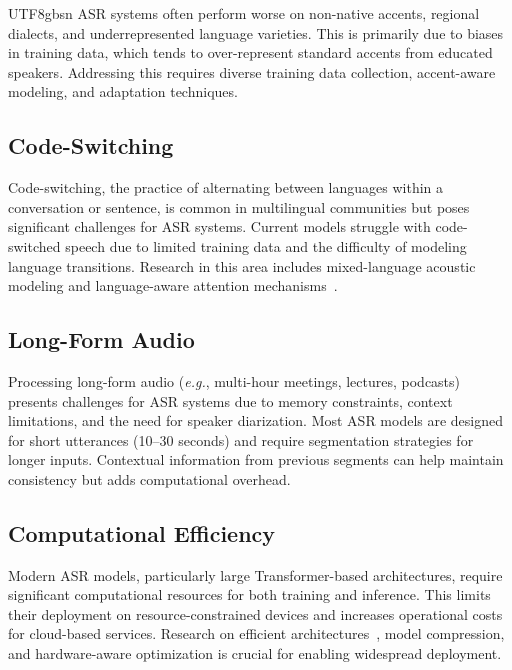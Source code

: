\documentclass[12pt,a4paper]{article}
\newcommand{\eg}{\textit{e.g.}}
\begin{document}
\begin{CJK}{UTF8}{gbsn}
ASR systems often perform worse on non-native accents, regional dialects, and underrepresented language varieties. This is primarily due to biases in training data, which tends to over-represent standard accents from educated speakers. Addressing this requires diverse training data collection, accent-aware modeling, and adaptation techniques.

\subsection{Code-Switching}
\label{subsec:codeswitch}

Code-switching, the practice of alternating between languages within a conversation or sentence, is common in multilingual communities but poses significant challenges for ASR systems. Current models struggle with code-switched speech due to limited training data and the difficulty of modeling language transitions. Research in this area includes mixed-language acoustic modeling and language-aware attention mechanisms~\cite{li2022code}.

\subsection{Long-Form Audio}
\label{subsec:longform}

Processing long-form audio (\eg, multi-hour meetings, lectures, podcasts) presents challenges for ASR systems due to memory constraints, context limitations, and the need for speaker diarization. Most ASR models are designed for short utterances (10--30 seconds) and require segmentation strategies for longer inputs. Contextual information from previous segments can help maintain consistency but adds computational overhead.

\subsection{Computational Efficiency}
\label{subsec:efficiency}

Modern ASR models, particularly large Transformer-based architectures, require significant computational resources for both training and inference. This limits their deployment on resource-constrained devices and increases operational costs for cloud-based services. Research on efficient architectures~\cite{kim2023squeezeformer}, model compression, and hardware-aware optimization is crucial for enabling widespread deployment.


\end{CJK}
\end{document}
